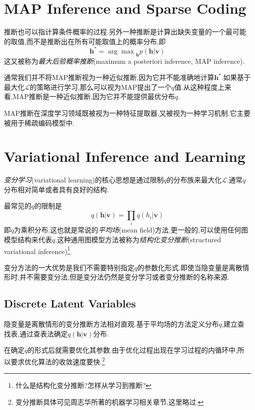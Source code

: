 \section{MAP Inference and Sparse Coding}

推断也可以指计算条件概率的过程.另外一种推断是计算出缺失变量的一个最可能的取值,而不是推断出在所有可能取值上的概率分布,即
\begin{equation}
\bm h^\ast={\arg\max}_{\bm h}p(\bm{h|v})
\end{equation}
这又被称为\textit{最大后验概率推断}(maximum a posteriori inference, MAP inference).

通常我们并不将MAP推断视为一种近似推断,因为它并不能准确地计算$\bm h^\ast$.如果基于最大化$\mathcal L$的策略进行学习,那么可以视为MAP提出了一个$q$值.从这种程度上来看,MAP推断是一种近似推断,因为它并不能提供最优分布$q$.

MAP推断在深度学习领域既被视为一种特征提取器,又被视为一种学习机制.它主要被用于稀疏编码模型中.

\section{Variational Inference and Learning}

\textit{变分学习}(variational learning)的核心思想是通过限制$q$的分布族来最大化$\mathcal L$.通常$q$分布相对简单或者具有良好的结构.

最常见的$q$的限制是
\begin{equation}
q(\bm{h|v})=\prod_iq(h_i|\bm v)
\end{equation}
即$q$为乘积分布.这也就是常说的\textit{平均场}(mean field)方法.更一般的,可以使用任何图模型结构来代表$q$,这种通用图模型方法被称为\textit{结构化变分推断}(structured variational inference)\footnote{什么是结构化变分推断?怎样从学习到推断?}

变分方法的一大优势是我们不需要特别指定$q$的参数化形式.即使当隐变量是离散情形时,并不需要变分法,但是变分法仍然是变分学习或者变分推断的名称来源.

\subsection{Discrete Latent Variables}

隐变量是离散情形的变分推断方法相对直观.基于平均场的方法定义分布$q$,建立查找表,通过查表法确定$q(\bm{h|v})$分布.

在确定$q$的形式后就需要优化其参数.由于优化过程出现在学习过程的内循环中,所以要求优化算法的收敛速度要快.\footnote{变分推断具体可见周志华所著的机器学习相关章节,这里略过.}


